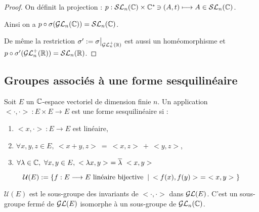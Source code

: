 \begin{proof}
On définit la projection : $p : \mathcal{SL}_n(\mathbb{C})\times \mathbb{C}^{*}\hspace{-0.1em} \owns (A,t) \longmapsto A
\in \mathcal{SL}_n(\mathbb{C})$.

Ainsi on a $p\circ\sigma(\mathcal{GL}_n(\mathbb{C})) = \mathcal{SL}_n(\mathbb{C})$.

De même la restriction $\sigma' := \sigma\big|_{\mathcal{GL}_n^+(\mathbb{R})}$ est aussi un
homéomorphisme et $p\circ \sigma'(\mathcal{GL}_n^+(\mathbb{R})) = \mathcal{SL}_n(\mathbb{R})$.
\end{proof}

\subsection{Groupes associés à une forme sesquilinéaire}
\vspace{0.5em}

\begin{defi}

Soit $E$ un $\mathbb{C}$-espace vectoriel de dimension finie $n$.
Un application $<\cdotp,\cdotp>\ : E\times E \longrightarrow E$ est une forme
sesquilinéaire si :
\begin{enumerate}
 \item $<x,\cdotp>\ : E \longrightarrow E$ est linéaire,
  \item $\forall x,y,z \in E,\ <x+y, z>\ =\ <x,z>\ +\ <y,z>$,
   \item $\forall \lambda \in \mathbb{C},\ \forall x,y\in E, \ <\lambda x,y>\ =
\overline{\lambda} \ <x,y>$
\end{enumerate}
\end{defi}

\begin{defiprop}
 
\begin{displaymath} \mathcal{U}(E) := \{f : E \longrightarrow E\text{ linéaire
bijective } \: | \:
<f(x),f(y)> \ = \ <x,y>\ \} \end{displaymath}

$\mathcal{U}(E)$ est le sous-groupe des invariants de $<\cdotp,\cdotp>$ dans
$\mathcal{GL}(E)$. C'est un sous-groupe fermé de $\mathcal{GL}(E)$ isomorphe à un sous-groupe de
$\mathcal{GL}_n(\mathbb{C})$.

\end{defiprop}

